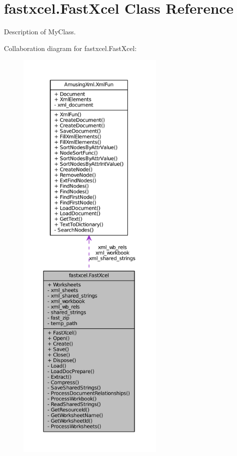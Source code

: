 \hypertarget{classfastxcel_1_1_fast_xcel}{
\section{fastxcel.FastXcel Class Reference}
\label{classfastxcel_1_1_fast_xcel}
}


Description of MyClass.  




Collaboration diagram for fastxcel.FastXcel:\nopagebreak
\begin{figure}[H]
\begin{center}
\leavevmode
\includegraphics[height=600pt]{classfastxcel_1_1_fast_xcel__coll__graph}
\end{center}
\end{figure}
